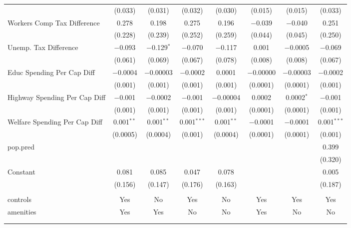 \begin{table}[!htbp]
\begin{tabular}{@{\extracolsep{5pt}}lccccccc}
  & (0.033) & (0.031) & (0.032) & (0.030) & (0.015) & (0.015) & (0.033) \\ 
  Workers Comp Tax Difference & 0.278 & 0.198 & 0.275 & 0.196 & $-$0.039 & $-$0.040 & 0.251 \\ 
  & (0.228) & (0.239) & (0.252) & (0.259) & (0.044) & (0.045) & (0.250) \\ 
  Unemp. Tax Difference & $-$0.093 & $-$0.129$^{*}$ & $-$0.070 & $-$0.117 & 0.001 & $-$0.0005 & $-$0.069 \\ 
  & (0.061) & (0.069) & (0.067) & (0.078) & (0.008) & (0.008) & (0.067) \\ 
  Educ Spending Per Cap Diff & $-$0.0004 & $-$0.00003 & $-$0.0002 & 0.0001 & $-$0.00000 & $-$0.00003 & $-$0.0002 \\ 
  & (0.001) & (0.001) & (0.001) & (0.001) & (0.0001) & (0.0001) & (0.001) \\ 
  Highway Spending Per Cap Diff & $-$0.001 & $-$0.0002 & $-$0.001 & $-$0.00004 & 0.0002 & 0.0002$^{*}$ & $-$0.001 \\ 
  & (0.001) & (0.001) & (0.001) & (0.001) & (0.0001) & (0.0001) & (0.001) \\ 
  Welfare Spending Per Cap Diff & 0.001$^{**}$ & 0.001$^{**}$ & 0.001$^{***}$ & 0.001$^{**}$ & $-$0.0001 & $-$0.0001 & 0.001$^{***}$ \\ 
  & (0.0005) & (0.0004) & (0.001) & (0.0004) & (0.0001) & (0.0001) & (0.001) \\ 
  pop.pred &  &  &  &  &  &  & 0.399 \\ 
  &  &  &  &  &  &  & (0.320) \\ 
  Constant & 0.081 & 0.085 & 0.047 & 0.078 &  &  & 0.005 \\ 
  & (0.156) & (0.147) & (0.176) & (0.163) &  &  & (0.187) \\ 
 \hline \\[-1.8ex] 
controls & Yes & No & Yes & No & Yes & Yes & Yes \\ 
amenities & Yes & Yes & No & No & Yes & No & No \\ 
\hline \\[-1.8ex] 
\hline 
\hline \\[-1.8ex] 
\end{tabular} 
\end{table} 
